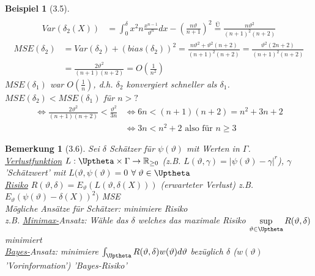 \documentclass[a4paper,openany]{book}
\theoremstyle{mytheoremstyle}
\newtheorem*{bei}{Beispiel}
\newtheorem*{bem}{Bemerkung}
\theoremstyle{mytheoremstyle2}
\begin{document}
\begin{bei}[3.5]
\begin{align*}
  \end{align*}
  \begin{align*}
    Var(\delta _2(X))&=\int_{0}^{\delta }{x^2 n \frac{x^{n-1}}{\vartheta ^n}dx}-\left(\frac{n \vartheta }{n+1}\right)^2 \overset{\text{Ü}}=\frac{n \vartheta ^2}{(n+1)^2(n+2)}
  \end{align*}
  \begin{align*}
    MSE(\delta _2)&=Var (\delta _2)+(bias(\delta _2))^2
    =\frac{n \vartheta ^2+\vartheta ^2(n+2)}{(n+1)^2(n+2)}=\frac{\vartheta ^2(2n+2)}{(n+1)^2(n+2)} \\
                  &=\frac{2 \vartheta ^2}{(n+1)(n+2)}=O \left(\frac{1}{n^2}\right)
  \end{align*}
  $MSE(\delta _1)$ war $O \left(\frac{1}{n}\right)$, d.h. $\delta _2$ konvergiert schneller als $\delta _1$. \\
  $MSE(\delta _2)<MSE(\delta _1)$ für $n>?$ 
  \begin{align*}
    \Leftrightarrow \frac{2 \vartheta ^2}{(n+1)(n+2)}<\frac{\vartheta ^2}{3n}&\Leftrightarrow 6n < (n+1)(n+2)=n^2+3n+2 \\
                                                                             & \Leftrightarrow 3n < n^2+2 \text{ also für }n \geq 3
  \end{align*}
\end{bei} 
\begin{bem}[3.6]
  Sei $\delta $ Schätzer für $\psi (\vartheta )$ mit Werten in $\Gamma $. \\
  \underline{Verlustfunktion} $L:\Uptheta \times \Gamma \to \mathbb{R} _{\geq 0}$ (z.B. $L(\vartheta ,\gamma )=|\psi (\vartheta)-\gamma|^r$), $\gamma $ 'Schätzwert' mit 
  $L(\vartheta ,\psi (\vartheta )=0$ $\forall\;\vartheta \in \Uptheta$ \\
  \underline{Risiko} $R(\vartheta ,\delta )=E _{\vartheta }(L(\vartheta ,\delta (X)))$ (erwarteter Verlust) z.B. 
  $E _{\vartheta }(\psi (\vartheta) -\delta (X))^2)$ MSE \\
  Mögliche Ansätze für Schätzer: minimiere Risiko\\
  z.B. \underline{Minimax-}Ansatz: Wähle das $\delta $ welches das maximale Risiko $\sup\limits _{\vartheta \in \Uptheta}R(\vartheta ,\delta )$  
  minimiert \\
  \underline{Bayes-}Ansatz: minimiere $\int_{\Uptheta}^{}{R(\vartheta ,\delta )w(\vartheta )d \vartheta }$ bezüglich $\delta $  ($w(\vartheta )$ 'Vorinformation') 'Bayes-Risiko'
\end{bem}
\end{document}
